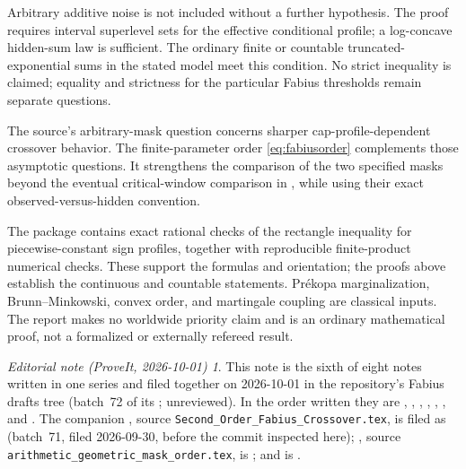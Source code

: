 \documentclass[11pt,a4paper]{article}
\theoremstyle{remark}\newtheorem*{ednote}{Editorial note (ProveIt, 2026-10-01)}
\begin{document}
Arbitrary additive noise is not included without a further hypothesis. The proof requires interval superlevel sets for the effective conditional profile; a log-concave hidden-sum law is sufficient. The ordinary finite or countable truncated-exponential sums in the stated model meet this condition. No strict inequality is claimed; equality and strictness for the particular Fabius thresholds remain separate questions.

The source's arbitrary-mask question \cite{Repository} concerns sharper cap-profile-dependent crossover behavior. The finite-parameter order \eqref{eq:fabiusorder} complements those asymptotic questions. It strengthens the comparison of the two specified masks beyond the eventual critical-window comparison in \cite{SecondOrder}, while using their exact observed-versus-hidden convention.

The package contains exact rational checks of the rectangle inequality for piecewise-constant sign profiles, together with reproducible finite-product numerical checks. These support the formulas and orientation; the proofs above establish the continuous and countable statements. Pr\'ekopa marginalization, Brunn--Minkowski, convex order, and martingale coupling are classical inputs. The report makes no worldwide priority claim and is an ordinary mathematical proof, not a formalized or externally refereed result.
\begin{ednote}
This note is the sixth of eight notes written in one series and filed together on 2026-10-01 in the repository's Fabius drafts tree (batch~72 of its ; unreviewed). In the order written they are , , , , , ,  and . 
The companion \cite{SecondOrder}, source
\texttt{Second\_Order\_Fabius\_Crossover.tex}, is filed as 
(batch~71, filed 2026-09-30, before the commit inspected here);
\cite{Arithmetic}, source \texttt{arithmetic\_geometric\_mask\_order.tex}, is
; and \cite{Repository} is
.
\end{ednote}
\end{document}
